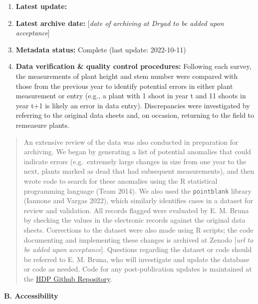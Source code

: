 \documentclass[
  12pt,
  man, donotrepeattitle]{apa6}
\begin{document}
\begin{enumerate}
\def\labelenumi{\arabic{enumi}.}
\item
  \textbf{Latest update:}
\item
  \textbf{Latest archive date:} {[}\emph{date of archiving at Dryad to be added upon acceptance}{]}
\item
  \textbf{Metadata status:} Complete (last update:
  2022-10-11)
\item
  \textbf{Data verification \& quality control procedures:} Following each survey, the measurements of plant height and stem number were compared with those from the previous year to identify potential errors in either plant measurement or entry (e.g., a plant with 1 shoot in year t and 11 shoots in year t+1 is likely an error in data entry). Discrepancies were investigated by referring to the original data sheets and, on occasion, returning to the field to remeasure plants.
\end{enumerate}

\begin{quote}
An extensive review of the data was also conducted in preparation for archiving. We began by generating a list of potential anomalies that could indicate errors (e.g.~extremely large changes in size from one year to the next, plants marked as dead that had subsequent measurements), and then wrote code to search for these anomalies using the R statistical programming language (Team 2014). We also used the \texttt{pointblank} library (Iannone and Vargas 2022), which similarly identifies cases in a dataset for review and validation. All records flagged were evaluated by E. M. Bruna by checking the values in the electronic records against the original data sheets. Corrections to the dataset were also made using R scripts; the code documenting and implementing these changes is archived at Zenodo {[}\emph{url to be added upon acceptance}{]}. Questions regarding the dataset or code should be referred to E. M. Bruna, who will investigate and update the database or code as needed. Code for any post-publication updates is maintained at the \href{https://github.com/BrunaLab/HeliconiaDataPaper}{HDP Github Repository}.
\end{quote}

\noindent 
\textbf{B. Accessibility}
\end{document}
